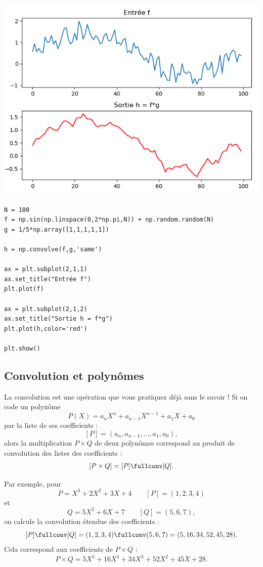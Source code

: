 \documentclass[11pt,class=report,crop=false]{standalone}
\begin{document}
\begin{center}
\includegraphics[scale=\myscale,scale=0.7]{figures/pythonconv-1d}
\end{center}

\begin{lstlisting}
N = 100
f = np.sin(np.linspace(0,2*np.pi,N)) + np.random.random(N)
g = 1/5*np.array([1,1,1,1,1])

h = np.convolve(f,g,'same')

ax = plt.subplot(2,1,1)
ax.set_title("Entrée f")
plt.plot(f)

ax = plt.subplot(2,1,2)
ax.set_title("Sortie h = f*g")
plt.plot(h,color='red')

plt.show()
\end{lstlisting}

\subsection{Convolution et polynômes}

La convolution est une opération que vous pratiquez déjà sans le savoir !
Si on code un polynôme 
$$P(X) = a_nX^n+a_{n-1}X^{n-1} + a_1X+a_0$$
par la liste de ses coefficients :
$$[P] = (a_n,a_{n-1},\ldots,a_1,a_0),$$
alors la multiplication $P \times Q$ de deux polynômes correspond au produit de convolution des listes des coefficients :
$$[P\times Q] = [P] \fullconv [Q].$$

Par exemple, pour 
$$P = X^3 + 2X^2 +3X + 4 \qquad [P] = (1,2,3,4)$$
et
$$Q = 5X^2 + 6X +7 \qquad [Q] = (5,6,7),$$
on calcule la convolution étendue des coefficients :
$$[P] \fullconv [Q] = (1,2,3,4) \fullconv (5,6,7)
= (5, 16, 34, 52, 45, 28).$$
Cela correspond aux coefficients de $P \times Q$ :
$$P \times Q = 5X^5 + 16X^4 + 34X^3 + 52X^2 + 45X + 28.$$
\end{document}

